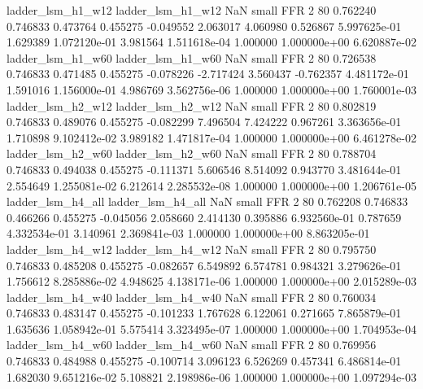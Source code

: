        ladder_lsm_h1_w12        ladder_lsm_h1_w12                   NaN      small      FFR                 2 80 0.762240       0.746833 0.473764       0.455275   -0.049552      2.063017      4.060980     0.526867   5.997625e-01  1.629389 1.072120e-01     3.981564   1.511618e-04            1.000000    1.000000e+00        6.620887e-02
       ladder_lsm_h1_w60        ladder_lsm_h1_w60                   NaN      small      FFR                 2 80 0.726538       0.746833 0.471485       0.455275   -0.078226     -2.717424      3.560437    -0.762357   4.481172e-01  1.591016 1.156000e-01     4.986769   3.562756e-06            1.000000    1.000000e+00        1.760001e-03
       ladder_lsm_h2_w12        ladder_lsm_h2_w12                   NaN      small      FFR                 2 80 0.802819       0.746833 0.489076       0.455275   -0.082299      7.496504      7.424222     0.967261   3.363656e-01  1.710898 9.102412e-02     3.989182   1.471817e-04            1.000000    1.000000e+00        6.461278e-02
       ladder_lsm_h2_w60        ladder_lsm_h2_w60                   NaN      small      FFR                 2 80 0.788704       0.746833 0.494038       0.455275   -0.111371      5.606546      8.514092     0.943770   3.481644e-01  2.554649 1.255081e-02     6.212614   2.285532e-08            1.000000    1.000000e+00        1.206761e-05
       ladder_lsm_h4_all        ladder_lsm_h4_all                   NaN      small      FFR                 2 80 0.762208       0.746833 0.466266       0.455275   -0.045056      2.058660      2.414130     0.395886   6.932560e-01  0.787659 4.332534e-01     3.140961   2.369841e-03            1.000000    1.000000e+00        8.863205e-01
       ladder_lsm_h4_w12        ladder_lsm_h4_w12                   NaN      small      FFR                 2 80 0.795750       0.746833 0.485208       0.455275   -0.082657      6.549892      6.574781     0.984321   3.279626e-01  1.756612 8.285886e-02     4.948625   4.138171e-06            1.000000    1.000000e+00        2.015289e-03
       ladder_lsm_h4_w40        ladder_lsm_h4_w40                   NaN      small      FFR                 2 80 0.760034       0.746833 0.483147       0.455275   -0.101233      1.767628      6.122061     0.271665   7.865879e-01  1.635636 1.058942e-01     5.575414   3.323495e-07            1.000000    1.000000e+00        1.704953e-04
       ladder_lsm_h4_w60        ladder_lsm_h4_w60                   NaN      small      FFR                 2 80 0.769956       0.746833 0.484988       0.455275   -0.100714      3.096123      6.526269     0.457341   6.486814e-01  1.682030 9.651216e-02     5.108821   2.198986e-06            1.000000    1.000000e+00        1.097294e-03
